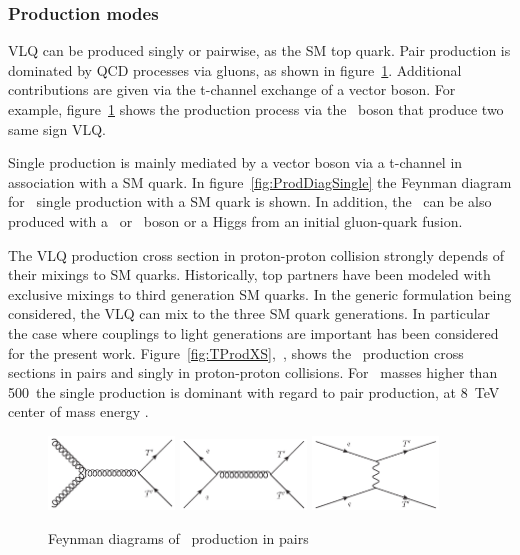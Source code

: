\subsubsection{Production modes}
\label{sec:prod}

VLQ can be produced singly or pairwise, as the SM top quark. Pair production is dominated by QCD processes via gluons, as shown in figure~\ref{fig:ProdDiagPair}. Additional contributions are given via the t-channel exchange of a vector boson. For example, figure~\ref{fig:ProdDiagPair} shows the production process via the \Z~boson that produce two same sign VLQ.   

Single production is mainly mediated by a vector boson via a t-channel in association with a SM quark. In figure~\ref{fig:ProdDiagSingle} the Feynman diagram for \Tp~single production with a SM quark is shown. In addition, the \Tp~can be also produced with a \Z~or \W~boson or a Higgs from an initial gluon-quark fusion. 

The VLQ production cross section in proton-proton collision strongly depends of their mixings to SM quarks. Historically, top partners have been modeled with exclusive mixings to third generation SM quarks. In the generic formulation being considered, the VLQ can mix to the three SM quark generations. In particular the case where couplings to light generations are important has been considered for the present work. Figure~\ref{fig:TProdXS},~\cite{Cacciapaglia:2011fx}, shows the \Tp~production cross sections in pairs and singly in proton-proton collisions. For \Tp~masses higher than 500~\GeVcc the single production is dominant with regard to pair production, at 8~TeV center of mass energy . 

\begin{figure}[!Hhtbp]
  \begin{center}
    \includegraphics[width=0.3\textwidth]{figs/Gluon_fusion_T_pair.jpg}
    \includegraphics[width=0.3\textwidth]{figs/Quarks_schannel_T_pair.jpg}
    \includegraphics[width=0.3\textwidth]{figs/Gluon_tchannel_T_pair.jpg}
    \caption{Feynman diagrams of \Tp~production in pairs}
    \label{fig:ProdDiagPair}
  \end{center}
\end{figure}

